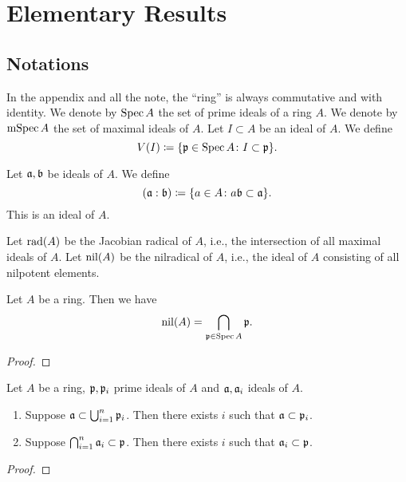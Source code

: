 \section{Elementary Results}


\subsection{Notations}

    In the appendix and all the note, the ``ring'' is always commutative and with identity.
    We denote by \(\operatorname{Spec} A\) the set of prime ideals of a ring \(A\).
    We denote by \(\operatorname{mSpec} A\) the set of maximal ideals of \(A\).
    Let \(I \subset A\) be an ideal of \(A\).
    We define 
    \[ V(I) \coloneqq \{ {\mathfrak{p}} \in \operatorname{Spec} A \colon I \subset {\mathfrak{p}}\}. \]

    Let \({\mathfrak{a}},{\mathfrak{b}}\) be ideals of \(A\).
    We define 
    \[ ({\mathfrak{a}} : {\mathfrak{b}}) \coloneqq \{ a \in A \colon a{\mathfrak{b}} \subset {\mathfrak{a}}\}. \]
    This is an ideal of \(A\).
    
    Let \(\operatorname{rad}(A)\) be the Jacobian radical of \(A\), i.e., the intersection of all maximal ideals of \(A\).
    Let \(\operatorname{nil}(A)\) be the nilradical of \(A\), i.e., the ideal of \(A\) consisting of all nilpotent elements.
    
    \begin{proposition}
        Let \(A\) be a ring.
        Then we have 
        \[ \operatorname{nil}(A) = \bigcap_{{\mathfrak{p}} \in \operatorname{Spec} A} {\mathfrak{p}}. \]
    \end{proposition}
    \begin{proof}
    \end{proof}

    \begin{proposition}\label{prop: prime avoidance lemma primity of prime ideals}
        Let $A$ be a ring, ${\mathfrak{p}},{\mathfrak{p}}_i$ prime ideals of $A$ and \({\mathfrak{a}},{\mathfrak{a}}_i\) ideals of $A$. 
        \begin{enumerate}
            \item Suppose \({\mathfrak{a}} \subset \bigcup_{i=1}^n {\mathfrak{p}}_i\). 
            Then there exists \(i\) such that \({\mathfrak{a}} \subset {\mathfrak{p}}_i\).
            \item Suppose \(\bigcap_{i=1}^n {\mathfrak{a}}_i \subset {\mathfrak{p}}\). 
            Then there exists \(i\) such that \({\mathfrak{a}}_i \subset {\mathfrak{p}}\).
        \end{enumerate}
    \end{proposition}
    \begin{proof}
    \end{proof}

